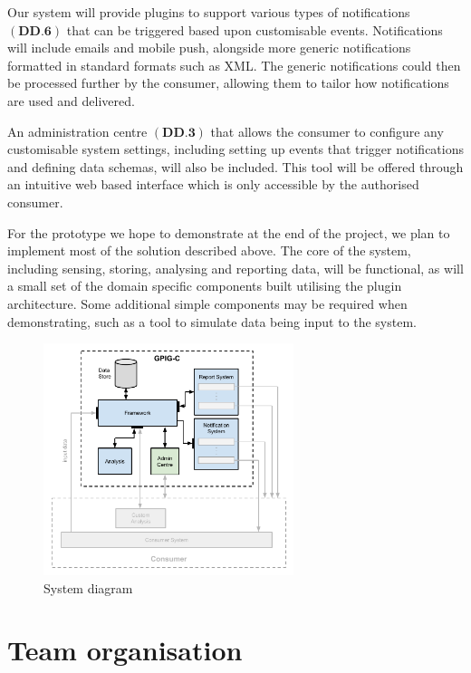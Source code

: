 \documentclass[10pt,a4paper]{article}
\begin{document}
Our system will provide plugins to support various types of notifications 
$(\textbf{DD.6})$ that can be triggered based upon customisable events. 
Notifications will include emails and mobile push, alongside more generic notifications formatted 
in standard formats such as XML. The generic notifications 
could then be processed further by the consumer, allowing them to tailor how 
notifications are used and delivered. 

An administration centre $(\textbf{DD.3})$ that allows
the consumer to configure any customisable system settings, including setting up
events that trigger notifications and defining data schemas, will also be included. This tool 
will be offered through an intuitive web based interface which is only accessible by the
authorised consumer. 

For the prototype we hope to demonstrate at the end of the project, we plan to
implement most of the solution described above. The core of the system,
including sensing, storing, analysing and reporting data, will be functional,
as will a small set of the domain specific components built utilising the plugin 
architecture. Some additional simple components may be required when 
demonstrating, such as a tool to simulate data being input to the system. 



\begin{figure}[H]
	\centering
	\includegraphics[width=0.65\textwidth]{system-architecture.pdf}
	\caption{System diagram}
	\label{fig:systemDiagram}
\end{figure}

\section{Team organisation}
\end{document}
